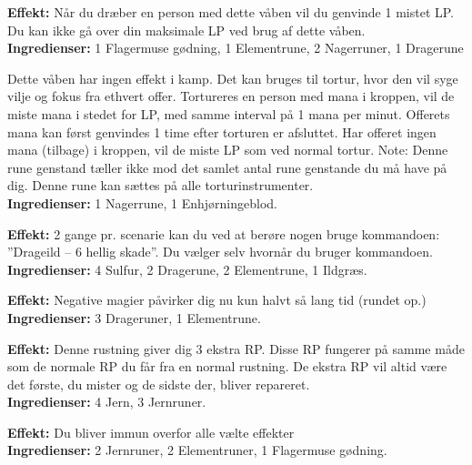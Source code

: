 \begin{runevåben*}[Livets Le]
\textbf{Effekt:} Når du dræber en person med dette våben vil du genvinde 1 mistet LP. Du kan ikke gå over din maksimale LP ved brug af dette våben.\\
\textbf{Ingredienser:} 1 Flagermuse gødning, 1 Elementrune, 2 Nagerruner, 1 Dragerune
\end{runevåben*}

\begin{runevåben*}
Dette våben har ingen effekt i kamp. Det kan bruges til tortur, hvor den vil syge vilje og fokus fra ethvert offer. Tortureres en person med mana i kroppen, vil de miste mana i stedet for LP, med samme interval på 1 mana per minut. Offerets mana kan først genvindes 1 time efter torturen er afsluttet. Har offeret ingen mana (tilbage) i kroppen, vil de miste LP som ved normal tortur.
Note: Denne rune genstand tæller ikke mod det samlet antal rune genstande du må have på dig. Denne rune kan sættes på alle torturinstrumenter.\\
\textbf{Ingredienser:} 1 Nagerrune, 1 Enhjørningeblod.
\end{runevåben*}

\begin{runerustning*}
\textbf{Effekt:} 2 gange pr. scenarie kan du ved at berøre nogen bruge kommandoen: ”Drageild – 6 hellig skade”. Du vælger selv hvornår du bruger kommandoen.\\
\textbf{Ingredienser:} 4 Sulfur, 2 Dragerune, 2 Elementrune, 1 Ildgræs.
\end{runerustning*}

\begin{runerustning*}
\textbf{Effekt:} Negative magier påvirker dig nu kun halvt så lang tid (rundet op.)\\
\textbf{Ingredienser:} 3 Drageruner, 1 Elementrune.
\end{runerustning*}

\begin{runerustning*}
\textbf{Effekt:} Denne rustning giver dig 3 ekstra RP. Disse RP fungerer på samme måde som de normale RP du får fra en normal rustning. De ekstra RP vil altid være det første, du mister og de sidste der, bliver repareret.\\
\textbf{Ingredienser:} 4 Jern, 3 Jernruner.
\end{runerustning*}

\begin{runerustning*}
\textbf{Effekt:} Du bliver immun overfor alle vælte effekter\\
\textbf{Ingredienser:} 2 Jernruner, 2 Elementruner, 1 Flagermuse gødning.
\end{runerustning*}

